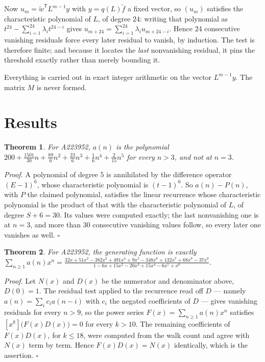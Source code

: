 \documentclass[11pt]{article}
\newtheorem{theorem}{Theorem}
\theoremstyle{definition}
\begin{document}
Now $u_m = \tilde w^{\mathsf T} L^{m-1} y$ with $y = q(L)\tilde f$ a fixed vector, so $(u_m)$ satisfies the characteristic polynomial of $L$, of degree $24$: writing that polynomial as $t^{24} - \sum_{i=1}^{24} \lambda_i t^{24-i}$ gives $u_{m+24} = \sum_{i=1}^{24} \lambda_i u_{m+24-i}$. Hence $24$ consecutive vanishing residuals force every later residual to vanish, by induction. The test is therefore finite; and because it locates the {\itshape last} nonvanishing residual, it pins the threshold exactly rather than merely bounding it.

Everything is carried out in exact integer arithmetic on the vector $L^{m-1}y$. The matrix $M$ is never formed.

\section{Results}

\begin{theorem} For A223952, $a(n)$ is the polynomial $200 + \frac{1501}{30}n + \frac{89}{6}n^{2} + \frac{23}{6}n^{3} + \frac{1}{6}n^{4} + \frac{2}{15}n^{5}$ for every $n > 3$, and not at $n = 3$.\end{theorem}

{\itshape Proof.} A polynomial of degree $5$ is annihilated by the difference operator $(E-1)^{6}$, whose characteristic polynomial is $(t-1)^{6}$. So $a(n) - P(n)$, with $P$ the claimed polynomial, satisfies the linear recurrence whose characteristic polynomial is the product of that with the characteristic polynomial of $L$, of degree $S + 6 = 30$. Its values were computed exactly; the last nonvanishing one is at $n = 3$, and more than $30$ consecutive vanishing values follow, so every later one vanishes as well. $\square$

\begin{theorem} For A223952, the generating function is exactly $\sum_{n\ge 1} a(n)x^n = \frac{32x + 51x^{2} - 382x^{3} + 491x^{4} + 9x^{5} - 348x^{6} + 132x^{7} + 68x^{8} - 37x^{9}}{1 - 6x + 15x^{2} - 20x^{3} + 15x^{4} - 6x^{5} + x^{6}}$.\end{theorem}

{\itshape Proof.} Let $N(x)$ and $D(x)$ be the numerator and denominator above, $D(0)=1$. The residual test applied to the recurrence read off $D$ --- namely $a(n) = \sum_i c_i a(n-i)$ with $c_i$ the negated coefficients of $D$ --- gives vanishing residuals for every $n > 9$, so the power series $F(x)=\sum_{n\ge 1}a(n)x^n$ satisfies $[x^k]\bigl(F(x)D(x)\bigr) = 0$ for every $k > 10$. The remaining coefficients of $F(x)D(x)$, for $k \le 18$, were computed from the walk count and agree with $N(x)$ term by term. Hence $F(x)D(x) = N(x)$ identically, which is the assertion. $\square$
\end{document}
